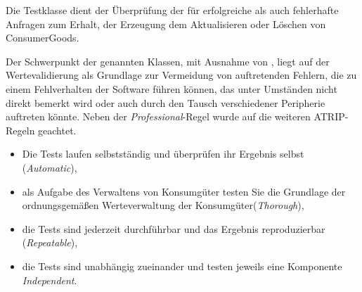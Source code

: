 Die Testklasse \href{https://github.com/lucasmerkel/dhbw-advancedswe-programmentwurf/blob/5764d7da4cfd0562ed8e96128e92f85c30b7309d/swe_programmentwurf/consumergoods-inventory-planner/0-cip-plugins/src/test/java/de/dhbw/cip/ConsumerGoodsGuiControllerTest.java}{} dient der Überprüfung der \href{https://github.com/lucasmerkel/dhbw-advancedswe-programmentwurf/blob/5764d7da4cfd0562ed8e96128e92f85c30b7309d/swe_programmentwurf/consumergoods-inventory-planner/0-cip-plugins/src/test/java/de/dhbw/cip/ConsumerGoodsGuiControllerTest.java#L56}{} für erfolgreiche als auch fehlerhafte Anfragen zum Erhalt, der Erzeugung dem Aktualisieren oder Löschen von ConsumerGoods.

Der Schwerpunkt der genannten Klassen, mit Ausnahme von \href{https://github.com/lucasmerkel/dhbw-advancedswe-programmentwurf/blob/5764d7da4cfd0562ed8e96128e92f85c30b7309d/swe_programmentwurf/consumergoods-inventory-planner/0-cip-plugins/src/test/java/de/dhbw/cip/ConsumerGoodsGuiControllerTest.java}{}, liegt auf der Wertevalidierung als Grundlage zur Vermeidung von auftretenden Fehlern, die zu einem Fehlverhalten der Software führen können, das unter Umständen nicht direkt bemerkt wird oder auch durch den Tausch verschiedener Peripherie auftreten könnte.
Neben der \textit{Professional}-Regel wurde auf die weiteren ATRIP-Regeln geachtet.
\begin{itemize}
    \item Die Tests laufen selbstständig und überprüfen ihr Ergebnis selbst (\textit{Automatic}),
    \item als Aufgabe des Verwaltens von Konsumgüter testen Sie die Grundlage der ordnungsgemäßen Werteverwaltung der Konsumgüter(\textit{Thorough}),
    \item die Tests sind jederzeit durchführbar und das Ergebnis reproduzierbar (\textit{Repeatable}),
    \item die Tests sind unabhängig zueinander und testen jeweils eine Komponente \textit{Independent}.
\end{itemize}

